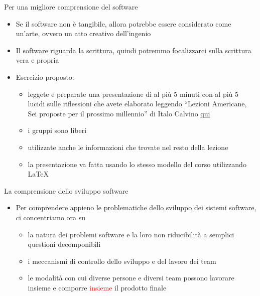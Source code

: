 \documentclass{beamer}
\begin{document}
\begin{frame}{\centerline{Per una migliore comprensione del software}}

\begin{itemize}
\item Se il software non \`{e} tangibile, allora potrebbe essere considerato come un'arte, ovvero un atto creativo dell'ingenio
\item Il software riguarda la scrittura, quindi potremmo focalizzarci sulla scrittura vera e propria 
\item Esercizio proposto: 
\begin{itemize}
\item leggete e preparate una presentazione di al pi\`{u} 5 minuti con al pi\`{u} 5 lucidi sulle riflessioni che avete elaborato leggendo ``Lezioni Americane, Sei proposte per il prossimo millennio'' di Italo Calvino \href{https://github.com/GiancarloSucci/UniBo.IDSEPC.A2022/blob/main/A2022.IDSEPC.ProcessoDiProduzione/ItaloCalvino.LezioniAmericane.pdf}{qui}
\item i gruppi sono liberi
\item utilizzate anche le informazioni che trovate nel resto della lezione
\item la presentazione va fatta usando lo stesso modello del corso utilizzando \LaTeX
\end{itemize}
\end{itemize}

\end{frame}


\begin{frame}{\centerline{La comprensione dello sviluppo software}}

\begin{itemize}
\item Per comprendere appieno le problematiche dello sviluppo dei sistemi software, ci concentriamo ora su
\begin{itemize}
\item la natura dei problemi software e la loro non riducibilit\`{a} a semplici questioni decomponibili
\item i meccanismi di controllo dello sviluppo e del lavoro dei team
\item le modalit\`{a} con cui diverse persone e diversi team possono lavorare insieme e comporre \textcolor{red}{insieme} il prodotto finale
\end{itemize}
\end{itemize}
\end{frame}
\end{document}
